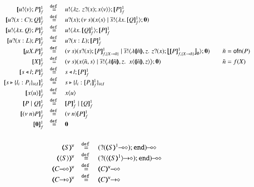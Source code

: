\begin{figure}[h!]
\[
	\begin{array}{rcll}
			\pmapp{\bout{u}{v} P}{1}{f}	&\defeq&	\bout{u}{ \abs{z}{\,\binp{z}{x} \appl{x}{v}} } \pmapp{P}{1}{f}
		\\
		\pmapp{\binp{u}{x: C} Q}{1}{f}	&\defeq&	\binp{u}{x} \newsp{s}{\appl{x}{s} \Par \bout{\dual{s}}{\abs{x}{\pmapp{Q}{1}{f}}} \inact}
		\\
				\pmapp{\bout{u}{\abs{x}{Q}} P}{1}{f} &\defeq& \bout{u}{\abs{x}{\pmapp{Q}{1}{f}}} \pmapp{P}{1}{f}
		\\
		\pmapp{\binp{u}{x: L} P}{1}{f}	&\defeq&	\binp{u}{x: L} \pmapp{P}{1}{f}
		\\
		\pmapp{\recp{X}{P}}{1}{f} &\defeq&
		\newsp{s}{\binp{s}{x} \pmapp{P}{1}{{f,\{\varp{X}\to \tilde{n}\}}} \Par
		\bout{\dual{s}}{\abs{\vmap{\tilde{n}}, z } \,{\binp{z}{x} \auxmap{\pmapp{P}{1}{{f,\{\varp{X}\to \tilde{n}\}}}}{\es}}} \inact} &
		\quad \tilde{n} = \ofn{P}
		\\
		\pmapp{\varp{X}}{1}{f} &\defeq& \newsp{s}{\appl{x}{\tilde{n}, s} \Par \bbout{\dual{s}}{ \abs{\vmap{\tilde{n}},z}\,\,{\appl{x}{ \vmap{\tilde{n}}, z}}} \inact} &
		\quad \tilde{n} = f(\varp{X})
		\\
		\pmapp{\bsel{s}{l} P}{1}{f}	&\defeq&	\bsel{s}{l} \pmapp{P}{1}{f}
		\\
		\pmapp{\bbra{s}{l_i: P_i}_{i \in I}}{1}{f} &\defeq& \bbra{s}{l_i: \pmapp{P_i}{1}{f}}_{i \in I}
		\\
		\pmapp{\appl{x}{u}}{1}{f}	&\defeq&	\appl{x}{u}
		\\
		\pmapp{P \Par Q}{1}{f}		&\defeq&	\pmapp{P}{1}{f} \Par \pmapp{Q}{1}{f}
		\\
		\pmapp{\news{n} P}{1}{f}	&\defeq&	\news{n} \pmapp{P}{1}{f}
		\\
		\pmapp{\inact}{1}{f}		&\defeq&	\inact
	\end{array}
\]
%
\[
	\begin{array}{rcl}
	\end{array}
\]
%
\[
	\begin{array}{c}
		\begin{array}{rcl}
			\tmap{S}{\mathsf{v}}		&\defeq& \lhot{(\btinp{\lhot{\tmap{S}{1}}} \tinact)}
			\\
			\tmap{\chtype{S}}{\mathsf{v}}	&\defeq& \lhot{(\btinp{\shot{\chtype{\tmap{S}{1}}}} \tinact)}
			\\
			\tmap{\lhot{C}}{\mathsf{v}}	&\defeq& \lhot{\tmap{C}{\mathsf{v}}}
			\\
			\tmap{\shot{C}}{\mathsf{v}}	&\defeq& \shot{\tmap{C}{\mathsf{v}}}

\end{array}
\end{array}\]
\end{figure}
